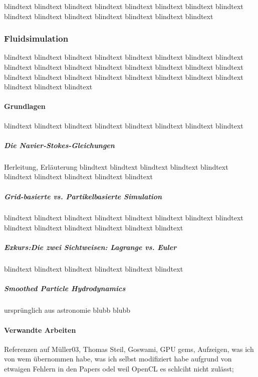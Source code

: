 

\label{sec:mechanicalDomain}
blindtext blindtext blindtext blindtext blindtext blindtext blindtext blindtext blindtext blindtext blindtext blindtext blindtext blindtext blindtext 
	
\subsubsection{Fluidsimulation}
blindtext blindtext blindtext blindtext blindtext blindtext blindtext blindtext blindtext blindtext blindtext 		
blindtext blindtext blindtext blindtext blindtext blindtext blindtext blindtext blindtext blindtext blindtext 
blindtext blindtext blindtext blindtext blindtext 
		
	\paragraph{Grundlagen}
	blindtext blindtext blindtext blindtext blindtext blindtext blindtext blindtext 
	
		\subparagraph{Die Navier-Stokes-Gleichungen}
		Herleitung, Erläuterung
		blindtext blindtext blindtext blindtext blindtext blindtext blindtext blindtext blindtext blindtext 
			
		\subparagraph{Grid-basierte vs. Partikelbasierte Simulation}
		\label{par:GridVsParticle}
		blindtext blindtext blindtext blindtext blindtext blindtext blindtext blindtext blindtext blindtext blindtext 
		blindtext blindtext blindtext 
			
		\subparagraph{Exkurs:Die zwei Sichtweisen: Lagrange vs. Euler}
		\label{par:lagrangeEuler}
		blindtext blindtext blindtext blindtext blindtext blindtext 
				
		\subparagraph{Smoothed Particle Hydrodynamics}
		ursprünglich aus astronomie blubb blubb 
		
	\paragraph{Verwandte Arbeiten}
	\label{sec:relatedWork}
	Referenzen auf Müller03, Thomas Steil, Goswami, GPU gems, Aufzeigen, was ich von wem übernommen habe, was ich selbst  
	modifiziert habe aufgrund von etwaigen Fehlern in den Papers odel weil OpenCL es schlciht nicht zulässt;
	

